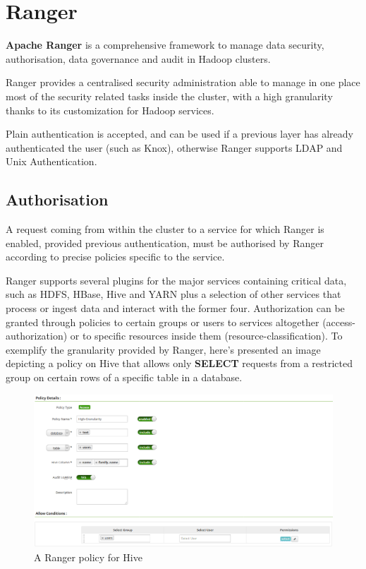 \section{Ranger}

\textbf{Apache Ranger} \cite{ranger_doc} is a comprehensive framework to manage data security, authorisation, data governance and audit in Hadoop clusters.

Ranger provides a centralised security administration able to manage in one place most of the security related tasks inside the cluster, with a high granularity thanks to its customization for Hadoop services.

Plain authentication is accepted, and can be used if a previous layer has already authenticated the user (such as Knox), otherwise Ranger supports LDAP and Unix Authentication.

\subsection{Authorisation}
A request coming from within the cluster to a service for which Ranger is enabled, provided previous authentication, must be authorised by Ranger according to precise policies specific to the service.

Ranger supports several plugins for the major services containing critical data, such as HDFS, HBase, Hive and YARN plus a selection of other services that process or ingest data and interact with the former four.
\newline Authorization can be granted through policies to certain groups or users to services altogether (access-authorization) or to specific resources inside them (resource-classification).
\newline
To exemplify the granularity provided by Ranger, here's presented an image depicting a policy on Hive that allows only \textbf{SELECT} requests from a restricted group on certain rows of a specific table in a database.

\begin{figure}
	\centering
	\includegraphics[scale=0.5]{Figures/policy.png}
	\decoRule
	\caption[Infrastructural Stack]{A Ranger policy for Hive}
	\label{fig:Policy}
\end{figure}

